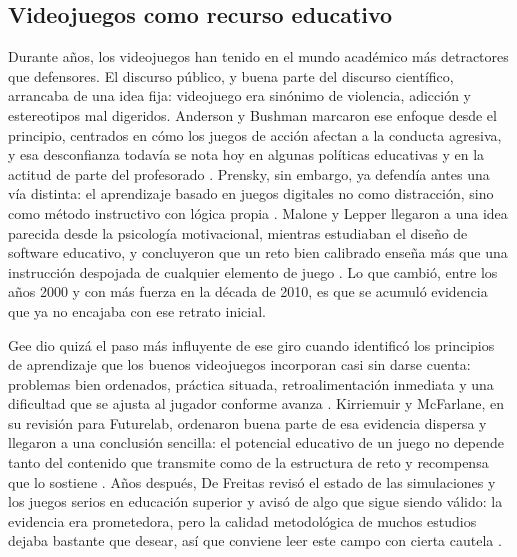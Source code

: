 \documentclass[a4paper,12pt]{article}
\begin{document}
\subsection{Videojuegos como recurso educativo}

Durante años, los videojuegos han tenido en el mundo académico más detractores que defensores. El discurso público, y buena parte del discurso científico, arrancaba de una idea fija: videojuego era sinónimo de violencia, adicción y estereotipos mal digeridos. Anderson y Bushman marcaron ese enfoque desde el principio, centrados en cómo los juegos de acción afectan a la conducta agresiva, y esa desconfianza todavía se nota hoy en algunas políticas educativas y en la actitud de parte del profesorado \citep{anderson2001effects}. Prensky, sin embargo, ya defendía antes una vía distinta: el aprendizaje basado en juegos digitales no como distracción, sino como método instructivo con lógica propia \citep{prensky2001dgbl}. Malone y Lepper llegaron a una idea parecida desde la psicología motivacional, mientras estudiaban el diseño de software educativo, y concluyeron que un reto bien calibrado enseña más que una instrucción despojada de cualquier elemento de juego \citep{malone1987makinglearning}. Lo que cambió, entre los años 2000 y con más fuerza en la década de 2010, es que se acumuló evidencia que ya no encajaba con ese retrato inicial.

Gee dio quizá el paso más influyente de ese giro cuando identificó los principios de aprendizaje que los buenos videojuegos incorporan casi sin darse cuenta: problemas bien ordenados, práctica situada, retroalimentación inmediata y una dificultad que se ajusta al jugador conforme avanza \citep{gee2003games}. Kirriemuir y McFarlane, en su revisión para Futurelab, ordenaron buena parte de esa evidencia dispersa y llegaron a una conclusión sencilla: el potencial educativo de un juego no depende tanto del contenido que transmite como de la estructura de reto y recompensa que lo sostiene \citep{kirriemuir2004literature}. Años después, De Freitas revisó el estado de las simulaciones y los juegos serios en educación superior y avisó de algo que sigue siendo válido: la evidencia era prometedora, pero la calidad metodológica de muchos estudios dejaba bastante que desear, así que conviene leer este campo con cierta cautela \citep{defreitas2006serious}.
\end{document}
